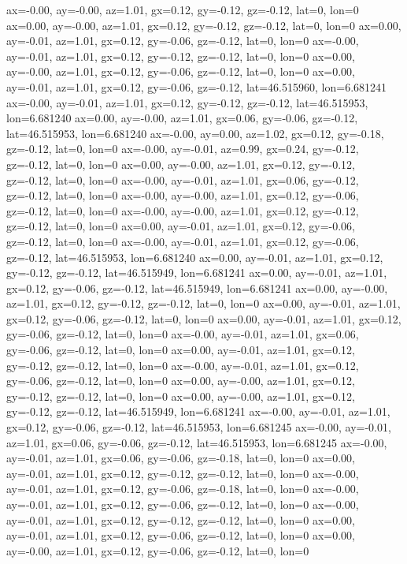 ax=-0.00, ay=-0.00, az=1.01, gx=0.12, gy=-0.12, gz=-0.12, lat=0, lon=0
ax=0.00, ay=-0.00, az=1.01, gx=0.12, gy=-0.12, gz=-0.12, lat=0, lon=0
ax=0.00, ay=-0.01, az=1.01, gx=0.12, gy=-0.06, gz=-0.12, lat=0, lon=0
ax=-0.00, ay=-0.01, az=1.01, gx=0.12, gy=-0.12, gz=-0.12, lat=0, lon=0
ax=0.00, ay=-0.00, az=1.01, gx=0.12, gy=-0.06, gz=-0.12, lat=0, lon=0
ax=0.00, ay=-0.01, az=1.01, gx=0.12, gy=-0.06, gz=-0.12, lat=46.515960, lon=6.681241
ax=-0.00, ay=-0.01, az=1.01, gx=0.12, gy=-0.12, gz=-0.12, lat=46.515953, lon=6.681240
ax=0.00, ay=-0.00, az=1.01, gx=0.06, gy=-0.06, gz=-0.12, lat=46.515953, lon=6.681240
ax=-0.00, ay=0.00, az=1.02, gx=0.12, gy=-0.18, gz=-0.12, lat=0, lon=0
ax=-0.00, ay=-0.01, az=0.99, gx=0.24, gy=-0.12, gz=-0.12, lat=0, lon=0
ax=0.00, ay=-0.00, az=1.01, gx=0.12, gy=-0.12, gz=-0.12, lat=0, lon=0
ax=-0.00, ay=-0.01, az=1.01, gx=0.06, gy=-0.12, gz=-0.12, lat=0, lon=0
ax=-0.00, ay=-0.00, az=1.01, gx=0.12, gy=-0.06, gz=-0.12, lat=0, lon=0
ax=-0.00, ay=-0.00, az=1.01, gx=0.12, gy=-0.12, gz=-0.12, lat=0, lon=0
ax=0.00, ay=-0.01, az=1.01, gx=0.12, gy=-0.06, gz=-0.12, lat=0, lon=0
ax=-0.00, ay=-0.01, az=1.01, gx=0.12, gy=-0.06, gz=-0.12, lat=46.515953, lon=6.681240
ax=0.00, ay=-0.01, az=1.01, gx=0.12, gy=-0.12, gz=-0.12, lat=46.515949, lon=6.681241
ax=0.00, ay=-0.01, az=1.01, gx=0.12, gy=-0.06, gz=-0.12, lat=46.515949, lon=6.681241
ax=0.00, ay=-0.00, az=1.01, gx=0.12, gy=-0.12, gz=-0.12, lat=0, lon=0
ax=0.00, ay=-0.01, az=1.01, gx=0.12, gy=-0.06, gz=-0.12, lat=0, lon=0
ax=0.00, ay=-0.01, az=1.01, gx=0.12, gy=-0.06, gz=-0.12, lat=0, lon=0
ax=-0.00, ay=-0.01, az=1.01, gx=0.06, gy=-0.06, gz=-0.12, lat=0, lon=0
ax=0.00, ay=-0.01, az=1.01, gx=0.12, gy=-0.12, gz=-0.12, lat=0, lon=0
ax=-0.00, ay=-0.01, az=1.01, gx=0.12, gy=-0.06, gz=-0.12, lat=0, lon=0
ax=0.00, ay=-0.00, az=1.01, gx=0.12, gy=-0.12, gz=-0.12, lat=0, lon=0
ax=0.00, ay=-0.00, az=1.01, gx=0.12, gy=-0.12, gz=-0.12, lat=46.515949, lon=6.681241
ax=-0.00, ay=-0.01, az=1.01, gx=0.12, gy=-0.06, gz=-0.12, lat=46.515953, lon=6.681245
ax=-0.00, ay=-0.01, az=1.01, gx=0.06, gy=-0.06, gz=-0.12, lat=46.515953, lon=6.681245
ax=-0.00, ay=-0.01, az=1.01, gx=0.06, gy=-0.06, gz=-0.18, lat=0, lon=0
ax=0.00, ay=-0.01, az=1.01, gx=0.12, gy=-0.12, gz=-0.12, lat=0, lon=0
ax=-0.00, ay=-0.01, az=1.01, gx=0.12, gy=-0.06, gz=-0.18, lat=0, lon=0
ax=-0.00, ay=-0.01, az=1.01, gx=0.12, gy=-0.06, gz=-0.12, lat=0, lon=0
ax=-0.00, ay=-0.01, az=1.01, gx=0.12, gy=-0.12, gz=-0.12, lat=0, lon=0
ax=0.00, ay=-0.01, az=1.01, gx=0.12, gy=-0.06, gz=-0.12, lat=0, lon=0
ax=0.00, ay=-0.00, az=1.01, gx=0.12, gy=-0.06, gz=-0.12, lat=0, lon=0
